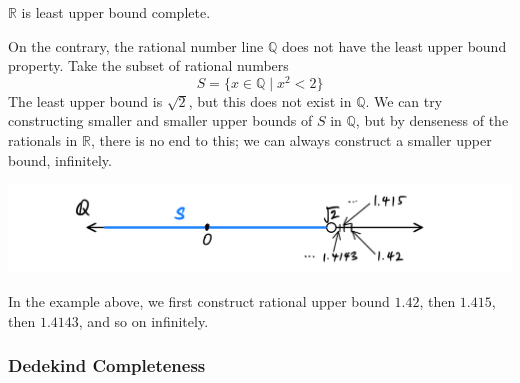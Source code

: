 \documentclass{article}
\begin{document}
        \begin{lemma}
          $\mathbb{R}$ is least upper bound complete. 
        \end{lemma}

        On the contrary, the rational number line $\mathbb{Q}$ does not have the least upper bound property. Take the subset of rational numbers
        \begin{equation}
            S = \{x \in \mathbb{Q} \;|\; x^2 <2 \}
        \end{equation}
        The least upper bound is $\sqrt{2}$, but this does not exist in $\mathbb{Q}$. We can try constructing smaller and smaller upper bounds of $S$ in $\mathbb{Q}$, but by denseness of the rationals in $\mathbb{R}$, there is no end to this; we can always construct a smaller upper bound, infinitely. 
        \begin{center}
          \includegraphics[scale=0.25]{img/Least_Upper_Bound_Property.PNG}
        \end{center}
        In the example above, we first construct rational upper bound $1.42$, then $1.415$, then $1.4143$, and so on infinitely. 

      \subsubsection{Dedekind Completeness}
\end{document}
